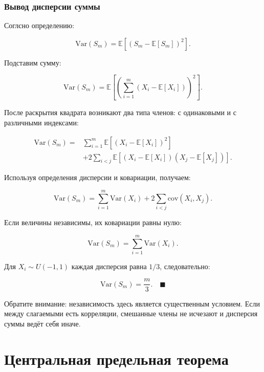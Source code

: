 \documentclass[
  russian,
  12pt,
  a4paper,
  a4paper,
  openany]{scrbook}
\begin{document}
\begin{bookderivation}

\subsubsection{Вывод дисперсии
суммы}\label{ux432ux44bux432ux43eux434-ux434ux438ux441ux43fux435ux440ux441ux438ux438-ux441ux443ux43cux43cux44b}

Соглсно определению:

\[\mathrm{Var}(S_m)
=\mathbb{E}\!\left[(S_m-\mathbb{E}[S_m])^2\right].\]

Подставим сумму:

\[\mathrm{Var}(S_m)
=
\mathbb{E}\!\left[
\left(
\sum_{i=1}^{m}(X_i-\mathbb{E}[X_i])
\right)^2
\right].\]

После раскрытия квадрата возникают два типа членов: с одинаковыми и с
различными индексами:

\[\begin{aligned}
\mathrm{Var}(S_m)
={}&
\sum_{i=1}^{m}
\mathbb{E}\!\left[(X_i-\mathbb{E}[X_i])^2\right]\\
&+2\sum_{i<j}
\mathbb{E}\!\left[(X_i-\mathbb{E}[X_i])(X_j-\mathbb{E}[X_j])\right].
\end{aligned}\]

Используя определения дисперсии и ковариации, получаем:

\[\boxed{
\mathrm{Var}(S_m)
=
\sum_{i=1}^{m}\mathrm{Var}(X_i)
+2\sum_{i<j}\mathrm{cov}(X_i,X_j).
}\]

Если величины независимы, их ковариации равны нулю:

\[\mathrm{Var}(S_m)
=
\sum_{i=1}^{m}\mathrm{Var}(X_i).\]

Для \(X_i\sim U(-1,1)\) каждая дисперсия равна \(1/3\), следовательно:

\[\boxed{\mathrm{Var}(S_m)=\frac{m}{3}.}\quad\blacksquare\]

\end{bookderivation}

Обратите внимание: независимость здесь является существенным условием.
Если между слагаемыми есть корреляции, смешанные члены не исчезают и
дисперсия суммы ведёт себя иначе.

\section{Центральная предельная
теорема}\label{ux446ux435ux43dux442ux440ux430ux43bux44cux43dux430ux44f-ux43fux440ux435ux434ux435ux43bux44cux43dux430ux44f-ux442ux435ux43eux440ux435ux43cux430}
\end{document}

